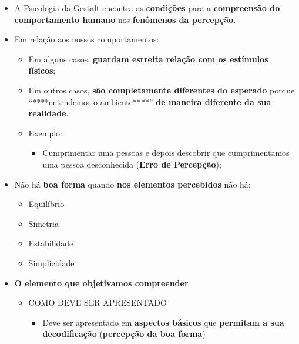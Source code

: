 \documentclass[
]{book}
\providecommand{\tightlist}{%
  \setlength{\itemsep}{0pt}\setlength{\parskip}{0pt}}
\begin{document}
\begin{itemize}
\tightlist
\item
  A Psicologia da Gestalt encontra as \textbf{condições} para a
  \textbf{compreensão do comportamento humano} nos \textbf{fenômenos da
  percepção}.
\item
  Em relação aos nossos comportamentos:

  \begin{itemize}
  \tightlist
  \item
    Em alguns casos, \textbf{guardam estreita relação com os estímulos
    físicos};
  \item
    Em outros casos, \textbf{são completamente diferentes do esperado}
    porque ``****entendemos o ambiente****'' \textbf{de maneira
    diferente da sua realidade}.
  \item
    Exemplo:

    \begin{itemize}
    \tightlist
    \item
      Cumprimentar uma pessoas e depois descobrir que cumprimentamos uma
      pessoa desconhecida (\textbf{Erro de Percepção});
    \end{itemize}
  \end{itemize}
\item
  Não há \textbf{boa forma} quando \textbf{nos elementos percebidos} não
  há:

  \begin{itemize}
  \tightlist
  \item
    Equilíbrio
  \item
    Simetria
  \item
    Estabilidade
  \item
    Simplicidade
  \end{itemize}
\item
  \textbf{O elemento que objetivamos compreender}

  \begin{itemize}
  \tightlist
  \item
    COMO DEVE SER APRESENTADO

    \begin{itemize}
    \tightlist
    \item
      Deve ser apresentado em \textbf{aspectos básicos} que
      \textbf{permitam a sua decodificação} (\textbf{percepção da boa
      forma})
    \end{itemize}
  \end{itemize}
\end{itemize}
\end{document}
